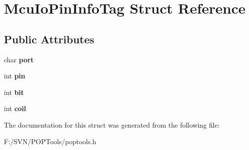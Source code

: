 \hypertarget{struct_mcu_io_pin_info_tag}{\section{Mcu\-Io\-Pin\-Info\-Tag Struct Reference}
\label{struct_mcu_io_pin_info_tag}
}
\subsection*{Public Attributes}
\begin{DoxyCompactItemize}
\item 
\hypertarget{struct_mcu_io_pin_info_tag_a9b56c1eac437f076738a8ea968a9a699}{char {\bfseries port}}\label{struct_mcu_io_pin_info_tag_a9b56c1eac437f076738a8ea968a9a699}

\item 
\hypertarget{struct_mcu_io_pin_info_tag_a8df37cf9caefd8351ddb9703f8a067f2}{int {\bfseries pin}}\label{struct_mcu_io_pin_info_tag_a8df37cf9caefd8351ddb9703f8a067f2}

\item 
\hypertarget{struct_mcu_io_pin_info_tag_a28f4b8f6297f3306808a2cdfcbe48157}{int {\bfseries bit}}\label{struct_mcu_io_pin_info_tag_a28f4b8f6297f3306808a2cdfcbe48157}

\item 
\hypertarget{struct_mcu_io_pin_info_tag_a9e871100783da4f5c3e7b2c8f56a2a52}{int {\bfseries coil}}\label{struct_mcu_io_pin_info_tag_a9e871100783da4f5c3e7b2c8f56a2a52}

\end{DoxyCompactItemize}


The documentation for this struct was generated from the following file\-:\begin{DoxyCompactItemize}
\item 
F\-:/\-S\-V\-N/\-P\-O\-P\-Tools/poptools.\-h\end{DoxyCompactItemize}
